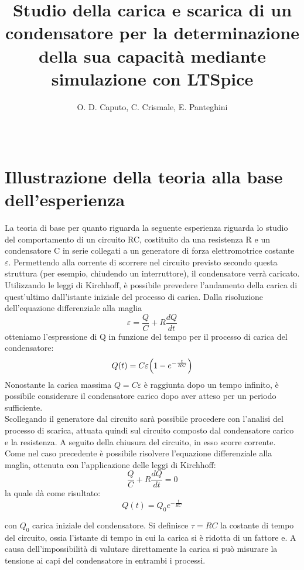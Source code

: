 \documentclass{article}
\title{Studio della carica e scarica di un condensatore per la determinazione della sua capacità mediante simulazione con LTSpice}
\author{O. D. Caputo, C. Crismale, E. Panteghini}
\date{~}
\begin{document}
\maketitle

\section{Illustrazione della teoria alla base dell’esperienza}
La teoria di base per quanto riguarda la seguente esperienza riguarda lo studio del comportamento di un circuito RC, costituito da una resistenza R e un condensatore C in serie collegati a un generatore di forza elettromotrice costante $\varepsilon$. Permettendo alla corrente di scorrere nel circuito previsto secondo questa struttura (per esempio, chiudendo un interruttore), il condensatore verrà caricato. Utilizzando le leggi di Kirchhoff, è possibile prevedere l’andamento della carica di quest'ultimo dall'istante iniziale del processo di carica. Dalla risoluzione dell’equazione differenziale alla maglia
\begin{equation}
    \varepsilon = \frac{Q}{C}+ R\frac{dQ}{dt}
\end{equation}
otteniamo l’espressione di Q in funzione del tempo per il processo di carica del condensatore:
\begin{equation}
    Q(t) = C\varepsilon \Bigl (1-e^{-\frac{t}{RC}} \Bigl )
\end{equation}
Nonostante la carica massima $Q = C\varepsilon$ è raggiunta dopo un tempo infinito, è possibile considerare il condensatore carico dopo aver atteso per un periodo sufficiente. \\
Scollegando il generatore dal circuito sarà possibile procedere con l'analisi del processo di scarica, attuata quindi sul circuito composto dal condensatore carico e la resistenza. A seguito della chiusura del circuito, in esso scorre corrente.\\ Come nel caso precedente è possibile risolvere l’equazione differenziale alla maglia, ottenuta con l’applicazione delle leggi di Kirchhoff:
\begin{equation}
    \frac{Q}{C} + R\frac{dQ}{dt} = 0
\end{equation}
la quale dà come risultato:
\begin{equation}
    Q(t) = Q_0 e^{-\frac{t}{RC}}
\end{equation}

\noindent con $Q_0$ carica iniziale del condensatore.
Si definisce $\tau = RC$ la costante di tempo del circuito, ossia l’istante di tempo in cui la carica si è ridotta di un fattore e.
A causa dell'impossibilità di valutare direttamente la carica si può misurare la tensione ai capi del condensatore in entrambi i processi.\\
\end{document}
